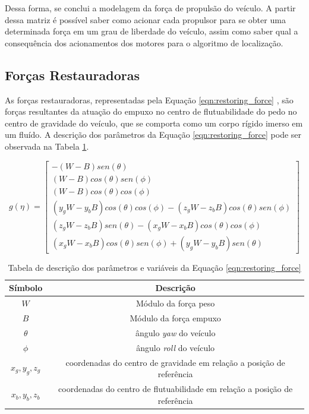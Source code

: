 Dessa forma, se conclui a modelagem da força de propulsão do veículo. A partir dessa matriz é possível saber como acionar cada propulsor para se obter uma determinada força em um grau de liberdade do veículo, assim como saber qual a consequência dos acionamentos dos motores para o algoritmo de localização.

\subsection{Forças Restauradoras}

As forças restauradoras, representadas pela Equação \ref{eqn:restoring_force} \cite{rov_modeling_1}, são forças resultantes da atuação do empuxo no centro de flutuabilidade do pedo no centro de gravidade do veículo, que se comporta como um corpo rígido imerso em um fluído. A descrição dos parâmetros da Equação \ref{eqn:restoring_force} pode ser observada na Tabela \ref{tab:restoring_force_param_desc}.

\begin{equation}
	\label{eqn:restoring_force}
	g(\eta) =
	\begin{bmatrix}
		-(W-B)sen(\theta)\\
		(W-B)cos(\theta)sen(\phi)\\
		(W-B)cos(\theta)cos(\phi)\\
		(y_gW-y_bB)cos(\theta)cos(\phi) - (z_gW-z_bB)cos(\theta)sen(\phi)\\		
		(z_gW-z_bB)sen(\theta) - (x_gW-x_bB)cos(\theta)cos(\phi)\\
		(x_gW-x_bB)cos(\theta)sen(\phi) + (y_gW-y_bB)sen(\theta)
	\end{bmatrix}  
\end{equation}

\begin{table}[H]
	\centering
	\label{tab:restoring_force_param_desc}
	\caption{Tabela de descrição dos parâmetros e variáveis da Equação \ref{eqn:restoring_force}}
	\begin{tabular}{ | c | c | } 
		\hline
		\textbf{Símbolo} & \textbf{Descrição}\\
		\hline
		$W$ & Módulo da força peso\\ 
		\hline
		$B$ & Módulo da força empuxo\\ 
		\hline
		$\theta$ & ângulo \textit{yaw} do veículo\\ 
		\hline
		$\phi$ & ângulo \textit{roll} do veículo\\ 
		\hline
		$x_g, y_g, z_g $ & coordenadas do centro de gravidade em relação a posição de referência \\ 
		\hline
		$x_b, y_b, z_b $ & coordenadas do centro de flutuabilidade em relação a posição de referência\\ 
		\hline
	\end{tabular}
\end{table}

